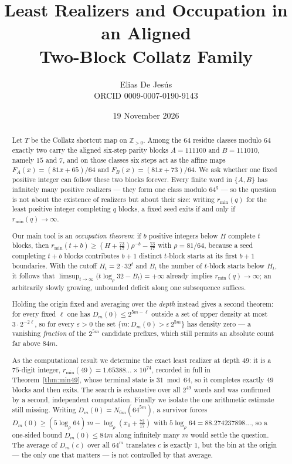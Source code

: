 \documentclass[11pt,a4paper]{article}
\title{Least Realizers and Occupation in an Aligned\\ Two-Block Collatz Family}
\author{Elias De Jes\'us\\ \small ORCID 0009-0007-0190-9143}
\date{19 November 2026}
\theoremstyle{plain}
\theoremstyle{definition}
\theoremstyle{remark}
\newcommand{\Zpos}{\mathbb{Z}_{>0}}
\begin{document}
\maketitle

\begin{abstract}
Let $T$ be the Collatz shortcut map on $\Zpos$. Among the $64$ residue classes
modulo $64$ exactly two carry the aligned six-step parity blocks
$A=111100$ and $B=111010$, namely $15$ and $7$, and on those classes six steps
act as the affine maps $F_A(x)=(81x+65)/64$ and $F_B(x)=(81x+73)/64$. We ask
whether one fixed positive integer can follow these two blocks forever.
Every finite word in $\{A,B\}$ has infinitely many positive realizers --- they
form one class modulo $64^q$ --- so the question is not about the existence of
realizers but about their size: writing $r_{\min}(q)$ for the least positive
integer completing $q$ blocks, a fixed seed exits if and only if
$r_{\min}(q)\to\infty$.

Our main tool is an \emph{occupation theorem}: if $b$ positive integers below
$H$ complete $t$ blocks, then
$r_{\min}(t+b)\ge (H+\tfrac{73}{17})\rho^{-b}-\tfrac{73}{17}$ with
$\rho=81/64$, because a seed completing $t+b$ blocks contributes $b+1$ distinct
$t$-block starts at its first $b+1$ boundaries. With the cutoff
$H_t=2\cdot 32^t$ and $B_t$ the number of $t$-block starts below $H_t$, it
follows that
$\limsup_{t\to\infty}\bigl(t\log_\rho 32-B_t\bigr)=+\infty$ already implies
$r_{\min}(q)\to\infty$; an arbitrarily slowly growing, unbounded deficit along
one subsequence suffices.

Holding the origin fixed and averaging over the \emph{depth} instead gives a
second theorem: for every fixed $\ell$ one has $D_m(0)\le 2^{5m-\ell}$ outside a
set of upper density at most $3\cdot2^{-2\ell}$, so for every $\varepsilon>0$ the
set $\{m:D_m(0)>\varepsilon\,2^{5m}\}$ has density zero --- a vanishing
\emph{fraction} of the $2^{5m}$ candidate prefixes, which still permits an
absolute count far above $84m$.

As the computational result we determine the exact least realizer at depth
$49$: it is a $75$-digit integer, $r_{\min}(49)=1.65388\ldots\times 10^{74}$,
recorded in full in Theorem~\ref{thm:min49}, whose terminal state is
$31\bmod 64$, so it completes exactly $49$ blocks and then exits. The search is
exhaustive over all $2^{49}$ words and was confirmed by a second, independent
computation. Finally we isolate the one
arithmetic estimate still missing. Writing $D_m(0)=N_{6m}(64^{5m})$, a survivor
forces $D_m(0)\ge (5\log_\rho 64)\,m-\log_\rho(x_0+\tfrac{73}{17})$ with
$5\log_\rho 64=88.274237898\ldots$, so a one-sided bound $D_m(0)\le 84m$ along
infinitely many $m$ would settle the question. The average of $D_m(c)$ over all
$64^m$ translates $c$ is exactly $1$, but the bin at the origin --- the only one
that matters --- is not controlled by that average.
\end{abstract}
\end{document}
